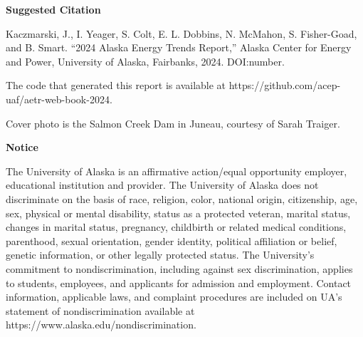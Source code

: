 \newpage

\noindent
{\centering
\bfseries\normalsize Suggested Citation
\par
}

Kaczmarski, J., I. Yeager, S. Colt, E. L. Dobbins, N. McMahon, S. Fisher-Goad, and B. Smart. “2024 Alaska Energy Trends Report,” Alaska Center for Energy and Power, University of Alaska, Fairbanks, 2024. DOI:number.

The code that generated this report is available at https://github.com/acep-uaf/aetr-web-book-2024. 

Cover photo is the Salmon Creek Dam in Juneau, courtesy of Sarah Traiger.

\vfill
\noindent
{\centering
\bfseries\normalsize Notice
\par
}
The University of Alaska is an affirmative action/equal opportunity employer, educational institution and provider.  The University of Alaska does not discriminate on the basis of race, religion, color, national origin, citizenship, age, sex, physical or mental disability, status as a protected veteran, marital status, changes in marital status, pregnancy, childbirth or related medical conditions, parenthood, sexual orientation, gender identity, political affiliation or belief, genetic information, or other legally protected status. The University's commitment to nondiscrimination, including against sex discrimination, applies to students, employees, and applicants for admission and employment. Contact information, applicable laws, and complaint procedures are included on UA's statement of nondiscrimination available at https://www.alaska.edu/nondiscrimination.


